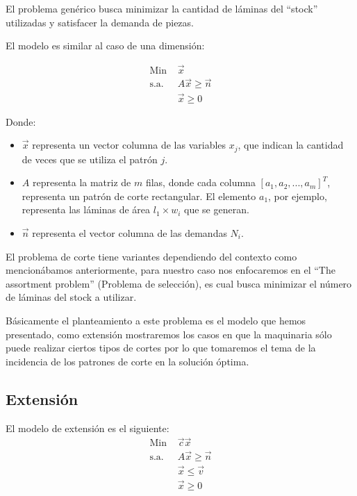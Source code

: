 \documentclass[journal, 10pt]{IEEEtran}
\begin{document}
	El problema genérico busca minimizar la cantidad de láminas del ``stock''
	utilizadas y satisfacer la demanda de piezas.
	
	El modelo es similar al caso de una dimensión:
	
	\begin{align*}
		\text{Min  } &\vec{x}\\
		\text{s.a.  } &A\vec{x} \geq \vec{n}\\
			&\vec{x} \geq 0
	\end{align*}
	
	Donde:
	\begin{itemize}
		\item
			$\vec{x}$ representa un vector columna de las variables $x_j$, que
			indican la cantidad de veces que se utiliza el patrón $j$.
		\item 
			$A$ representa la matriz de $m$ filas, donde cada columna 
			$[a_1,a_2,...,a_m]^T$, representa un patrón de corte rectangular. 
			El elemento $a_1$, por ejemplo, representa las láminas de 
			área $l_1 \times w_i$ que se generan.
		\item
			$\vec{n}$ representa el vector columna de las demandas $N_i$.
	\end{itemize}
	
	El problema de corte tiene variantes dependiendo del contexto como
	mencionábamos anteriormente, para nuestro caso nos enfocaremos en el ``The
	assortment problem'' (Problema de selección), es cual busca minimizar el
	número de láminas del stock a utilizar.

	Básicamente el planteamiento a este problema es el modelo que hemos
	presentado, como extensión mostraremos los casos en que la maquinaria sólo
	puede realizar ciertos tipos de cortes por lo que tomaremos el tema de la
	incidencia de los patrones de corte en la solución óptima.
	
\subsection{Extensión}
	El modelo de extensión es el siguiente:
	\begin{align*}
		\text{Min  } &\vec{c}\vec{x}\\
		\text{s.a.  } &A\vec{x} \geq \vec{n}\\
			&\vec{x} \leq \vec{v}\\
			&\vec{x} \geq 0
	\end{align*}
	
\end{document}

